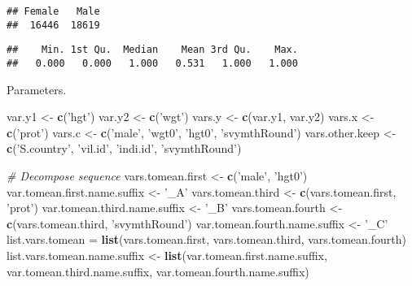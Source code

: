 \documentclass[
]{book}
\newenvironment{Shaded}{\begin{snugshade}}{\end{snugshade}}
\newcommand{\CommentTok}[1]{\textcolor[rgb]{0.56,0.35,0.01}{\textit{#1}}}
\newcommand{\KeywordTok}[1]{\textcolor[rgb]{0.13,0.29,0.53}{\textbf{#1}}}
\newcommand{\NormalTok}[1]{#1}
\newcommand{\OperatorTok}[1]{\textcolor[rgb]{0.81,0.36,0.00}{\textbf{#1}}}
\newcommand{\StringTok}[1]{\textcolor[rgb]{0.31,0.60,0.02}{#1}}
\begin{document}
\begin{verbatim}
## Female   Male 
##  16446  18619
\end{verbatim}

\begin{Shaded}
\end{Shaded}

\begin{verbatim}
##    Min. 1st Qu.  Median    Mean 3rd Qu.    Max. 
##   0.000   0.000   1.000   0.531   1.000   1.000
\end{verbatim}

Parameters.

\begin{Shaded}
\begin{Highlighting}[]
\NormalTok{var.y1 <-}\StringTok{ }\KeywordTok{c}\NormalTok{(}\StringTok{'hgt'}\NormalTok{)}
\NormalTok{var.y2 <-}\StringTok{ }\KeywordTok{c}\NormalTok{(}\StringTok{'wgt'}\NormalTok{)}
\NormalTok{vars.y <-}\StringTok{ }\KeywordTok{c}\NormalTok{(var.y1, var.y2)}
\NormalTok{vars.x <-}\StringTok{ }\KeywordTok{c}\NormalTok{(}\StringTok{'prot'}\NormalTok{)}
\NormalTok{vars.c <-}\StringTok{ }\KeywordTok{c}\NormalTok{(}\StringTok{'male'}\NormalTok{, }\StringTok{'wgt0'}\NormalTok{, }\StringTok{'hgt0'}\NormalTok{, }\StringTok{'svymthRound'}\NormalTok{)}
\NormalTok{vars.other.keep <-}\StringTok{ }\KeywordTok{c}\NormalTok{(}\StringTok{'S.country'}\NormalTok{, }\StringTok{'vil.id'}\NormalTok{, }\StringTok{'indi.id'}\NormalTok{, }\StringTok{'svymthRound'}\NormalTok{)}

\CommentTok{# Decompose sequence}
\NormalTok{vars.tomean.first <-}\StringTok{ }\KeywordTok{c}\NormalTok{(}\StringTok{'male'}\NormalTok{, }\StringTok{'hgt0'}\NormalTok{)}
\NormalTok{var.tomean.first.name.suffix <-}\StringTok{ '_A'}
\NormalTok{vars.tomean.third <-}\StringTok{ }\KeywordTok{c}\NormalTok{(vars.tomean.first, }\StringTok{'prot'}\NormalTok{)}
\NormalTok{var.tomean.third.name.suffix <-}\StringTok{ '_B'}
\NormalTok{vars.tomean.fourth <-}\StringTok{ }\KeywordTok{c}\NormalTok{(vars.tomean.third, }\StringTok{'svymthRound'}\NormalTok{)}
\NormalTok{var.tomean.fourth.name.suffix <-}\StringTok{ '_C'}
\NormalTok{list.vars.tomean =}\StringTok{ }\KeywordTok{list}\NormalTok{(vars.tomean.first,}
\NormalTok{                        vars.tomean.third,}
\NormalTok{                        vars.tomean.fourth)}
\NormalTok{list.vars.tomean.name.suffix <-}\StringTok{ }\KeywordTok{list}\NormalTok{(var.tomean.first.name.suffix,}
\NormalTok{                                     var.tomean.third.name.suffix,}
\NormalTok{                                     var.tomean.fourth.name.suffix)}
\end{Highlighting}
\end{Shaded}
\end{document}
